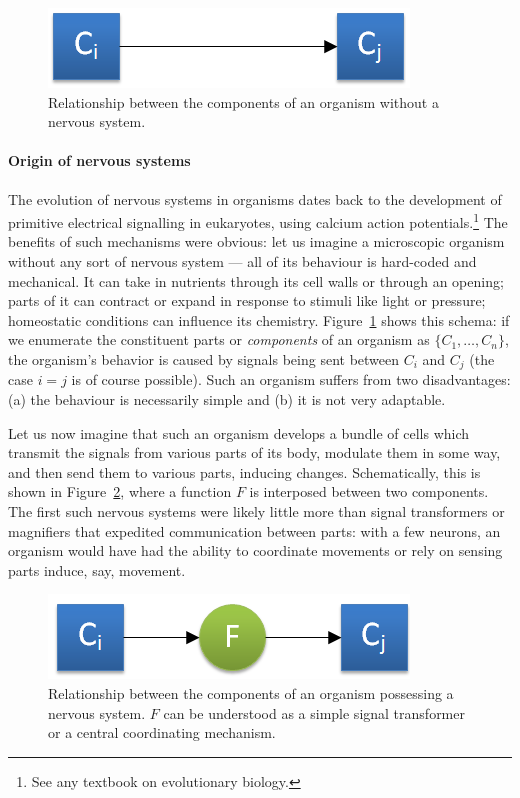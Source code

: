 \begin{figure}[!h]
	\centering
	\includegraphics{figs/noNervousSystem.png}
	\caption{Relationship between the components of an organism without a nervous system.}
	\label{fig:noNervousSystem}
\end{figure}
\vspace{-0.18cm}
\paragraph{Origin of nervous systems} The evolution of nervous systems in organisms dates back to the development of primitive electrical signalling in eukaryotes, using calcium action potentials.\footnote{See any textbook on evolutionary biology.} The benefits of such mechanisms were obvious: let us imagine a microscopic organism without any sort of nervous system --- all of its behaviour is hard-coded and mechanical. It can take in nutrients through its cell walls or through an opening; parts of it can contract or expand in response to stimuli like light or pressure; homeostatic conditions can influence its chemistry. Figure~\ref{fig:noNervousSystem} shows this schema: if we enumerate the constituent parts or {\em components} of an organism as $\{C_1,\dots,C_n\}$, the organism's behavior is caused by signals being sent between $C_i$ and $C_j$ (the case $i=j$ is of course possible). Such an organism suffers from two disadvantages: (a) the behaviour is necessarily simple and (b) it is not very adaptable.

Let us now imagine that such an organism develops a bundle of cells which transmit the signals from various parts of its body, modulate them in some way, and then send them to various parts, inducing changes. Schematically, this is shown in Figure~\ref{fig:nervousSystem}, where a function $F$ is interposed between two components. The first such nervous systems were likely little more than signal transformers or magnifiers that expedited communication between parts: with a few neurons, an organism would have had the ability to coordinate movements or rely on sensing parts induce, say, movement.

\begin{figure}
	\centering
	\includegraphics{figs/nervousSystem.png}
	\caption{Relationship between the components of an organism possessing a nervous system. $F$ can be understood as a simple signal transformer or a central coordinating mechanism.}
	\label{fig:nervousSystem}
\end{figure}

